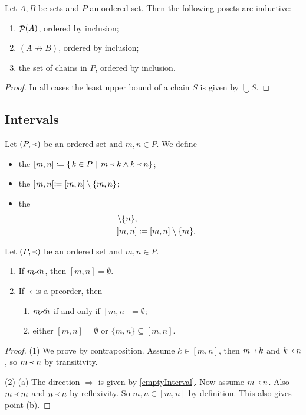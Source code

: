 \begin{proposition} \label{inductive}
Let $A,B$ be sets and $P$ an ordered set. Then the following posets are inductive:
\begin{enumerate}
\item $\mathop{\mathcal{P}}(A)$, ordered by inclusion;
\item $(A \not\to B)$, ordered by inclusion;
\item the set of chains in $P$, ordered by inclusion.
\end{enumerate}
\end{proposition}
\begin{proof}
In all cases the least upper bound of a chain $S$ is given by $\bigcup S$.
\end{proof}

\subsection{Intervals}
\begin{definition}
Let $(P,\Yleft)$ be an ordered set and $m,n\in P$. We define
\begin{itemize}
\item the  $[m,n] \coloneqq \left\{\left. k\in P \;\right|\; m\Yleft k \land k\Yleft n \right\}$;
\item the  $]m,n[ \coloneqq [m,n]\setminus\{m,n\}$;
\item the 
\begin{align*}
[m,n[ &\defeq [m,n]\setminus\{n\}; \\
]m,n] &\defeq [m,n]\setminus\{m\}.
\end{align*}
\end{itemize}
\end{definition}

\begin{lemma} \label{emptyInterval}
Let $(P,\Yleft)$ be an ordered set and $m,n\in P$.
\begin{enumerate}
\item If $m \cancel\Yleft n$, then $[m,n] = \emptyset$.
\item If $\Yleft$ is a preorder, then
\begin{enumerate}
\item $m \cancel\Yleft n$ \textup{if and only if} $[m,n] = \emptyset$;
\item either $[m,n] = \emptyset$ or $\{m,n\} \subseteq [m,n]$.
\end{enumerate}
\end{enumerate}
\end{lemma}
\begin{proof}
(1) We prove by contraposition. Assume $k\in [m,n]$, then $m\Yleft k$ and $k\Yleft n$, so $m\Yleft n$ by transitivity.

(2) (a) The direction $\Rightarrow$ is given by \ref{emptyInterval}. Now assume $m \Yleft n$. Also $m\Yleft m$ and $n \Yleft n$ by reflexivity. So $m,n\in [m,n]$ by definition. This also gives point (b).
\end{proof}

